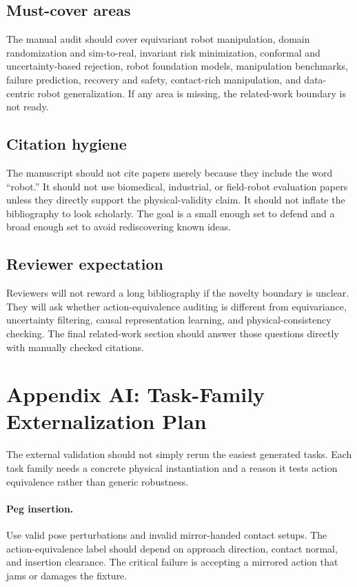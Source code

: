 \documentclass{article}
\begin{document}
\subsection{Must-cover areas}
The manual audit should cover equivariant robot manipulation, domain randomization and sim-to-real, invariant risk minimization, conformal and uncertainty-based rejection, robot foundation models, manipulation benchmarks, failure prediction, recovery and safety, contact-rich manipulation, and data-centric robot generalization. If any area is missing, the related-work boundary is not ready.

\subsection{Citation hygiene}
The manuscript should not cite papers merely because they include the word ``robot.'' It should not use biomedical, industrial, or field-robot evaluation papers unless they directly support the physical-validity claim. It should not inflate the bibliography to look scholarly. The goal is a small enough set to defend and a broad enough set to avoid rediscovering known ideas.

\subsection{Reviewer expectation}
Reviewers will not reward a long bibliography if the novelty boundary is unclear. They will ask whether action-equivalence auditing is different from equivariance, uncertainty filtering, causal representation learning, and physical-consistency checking. The final related-work section should answer those questions directly with manually checked citations.


\section{Appendix AI: Task-Family Externalization Plan}
The external validation should not simply rerun the easiest generated tasks. Each task family needs a concrete physical instantiation and a reason it tests action equivalence rather than generic robustness.

\paragraph{Peg insertion.} Use valid pose perturbations and invalid mirror-handed contact setups. The action-equivalence label should depend on approach direction, contact normal, and insertion clearance. The critical failure is accepting a mirrored action that jams or damages the fixture.
\end{document}

